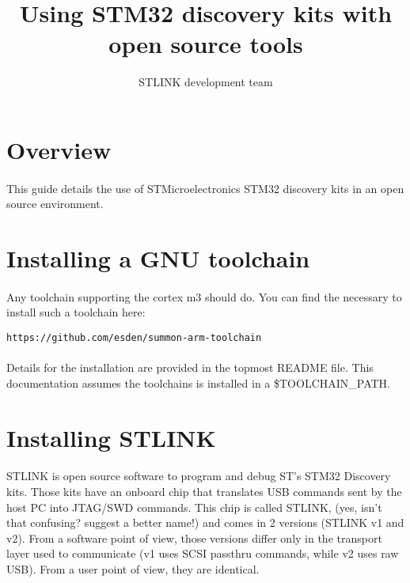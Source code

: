 \documentclass[a4paper, 11pt]{article}
\begin{document}
\title{Using STM32 discovery kits with open source tools}
\author{STLINK development team}
\date{}

\maketitle

\newpage
\tableofcontents
{}


\newpage

\section{Overview}
\paragraph{}
This guide details the use of STMicroelectronics STM32 discovery kits in
an open source environment.


\newpage

\section{Installing a GNU toolchain}
\paragraph{}
Any toolchain supporting the cortex m3 should do. You can find the necessary
to install such a toolchain here:\\
\begin{small}
\begin{lstlisting}[frame=tb]
https://github.com/esden/summon-arm-toolchain
\end{lstlisting}
\end{small}

\paragraph{}
Details for the installation are provided in the topmost README file.
This documentation assumes the toolchains is installed in a \$TOOLCHAIN\_PATH.


\newpage

\section{Installing STLINK}
\paragraph{}
STLINK is open source software to program and debug ST's STM32 Discovery kits. Those
kits have an onboard chip that translates USB commands sent by the host PC into
JTAG/SWD commands. This chip is called STLINK, (yes, isn't that confusing? suggest a better
name!)  and comes in 2 versions (STLINK v1 and v2). From a software
point of view, those versions differ only in the transport layer used to communicate
(v1 uses SCSI passthru commands, while v2 uses raw USB).  From a user point of view, they 
are identical. 
\end{document}
